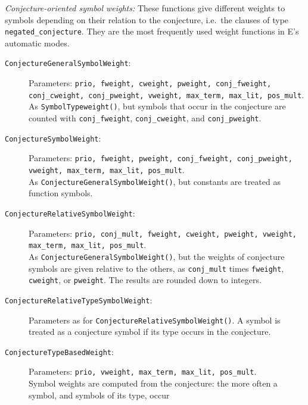 \documentclass{report}
\begin{document}
\medskip
\noindent\emph{Conjecture-oriented symbol weights:} These functions
give different weights to symbols depending on their relation to the
conjecture, i.e.\ the clauses of type
\texttt{negated\_conjecture}. They are the most frequently used
weight functions in E's automatic modes.

\begin{description}
\item[\texttt{ConjectureGeneralSymbolWeight}:] Parameters:
    \texttt{prio, fweight, cweight, pweight, conj\_fweight,
    conj\_cweight, conj\_pweight, vweight, max\_term, max\_lit,
    pos\_mult}.\\
  As \texttt{SymbolTypeweight()},
  but symbols that occur in the conjecture are counted with
  \texttt{conj\_fweight}, \texttt{conj\_cweight}, and
  \texttt{conj\_pweight}.
\item[\texttt{ConjectureSymbolWeight}:] Parameters: \texttt{prio,
    fweight, pweight, conj\_fweight, conj\_pweight, vweight,
    max\_term, max\_lit, pos\_mult}.\\
  As \texttt{ConjectureGeneralSymbolWeight()}, but
  constants are treated as function symbols.
\item[\texttt{ConjectureRelativeSymbolWeight}:] Parameters:
    \texttt{prio, conj\_mult, fweight, cweight, pweight, vweight,
    max\_term, max\_lit, pos\_mult}.\\
  As
  \texttt{ConjectureGeneralSymbolWeight()}, but the weights of
  conjecture symbols are given relative to the others, as
  \texttt{conj\_mult} times \texttt{fweight}, \texttt{cweight}, or
  \texttt{pweight}. The results are rounded down to integers.
\item[\texttt{ConjectureRelativeTypeSymbolWeight}:] Parameters as
  for \texttt{ConjectureRelativeSymbolWeight()}. A symbol is treated
  as a conjecture symbol if its type occurs in the conjecture.
\item[\texttt{ConjectureTypeBasedWeight}:] Parameters: \texttt{prio,
    vweight, max\_term, max\_lit, pos\_mult}.\\
  Symbol weights are computed from the
  conjecture: the more often a symbol, and symbols of its type, occur

\end{description}
\end{document}
